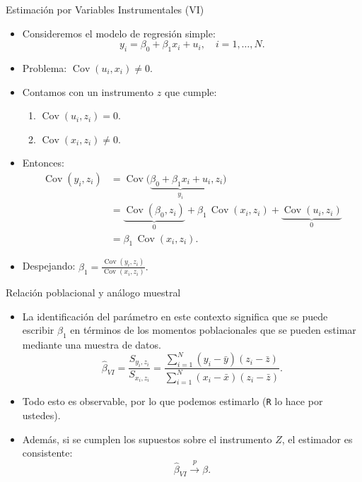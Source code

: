 \documentclass[10pt]{beamer}
\begin{document}
\begin{frame}{Estimaci\'on por Variables Instrumentales (VI)}
    \begin{itemize}
        \item Consideremos el modelo de regresi\'on simple:
        $$
        y_{i}=\beta_{0}+\beta_{1} x_{i}+u_{i}, \quad i=1,\ldots,N.
        $$
        \item Problema: $\operatorname{Cov}\left(u_{i},x_{i}\right) \neq 0$.
        \item Contamos con un instrumento $z$ que cumple:
        \begin{enumerate}
            \item $\operatorname{Cov}\left(u_{i},z_{i}\right)=0$.
            \item $\operatorname{Cov}\left(x_{i},z_{i}\right)\neq 0$.
        \end{enumerate}
        \item Entonces:
        $$
        \begin{aligned}
        \operatorname{Cov}\left(y_{i},z_{i}\right) &= \operatorname{Cov}\bigl(\underbrace{\beta_{0}+\beta_{1}x_{i}+u_{i}}_{y_{i}}, z_{i}\bigr) \\
        &= \underbrace{\operatorname{Cov}\left(\beta_{0},z_{i}\right)}_{0} + \beta_{1}\, \operatorname{Cov}\left(x_{i},z_{i}\right) + \underbrace{\operatorname{Cov}\left(u_{i},z_{i}\right)}_{0} \\
        &= \beta_{1}\, \operatorname{Cov}\left(x_{i},z_{i}\right).
        \end{aligned}
        $$
        \item Despejando:
$\beta_{1}=\frac{\operatorname{Cov}\left(y_{i},z_{i}\right)}{\operatorname{Cov}\left(x_{i},z_{i}\right)}.
        $
       
    \end{itemize}
\end{frame}

\begin{frame}{Relaci\'on poblacional y an\'alogo muestral}
    \begin{itemize}
     \item La {\color{blue}identificación} del
 parámetro en este contexto significa que se puede escribir $\beta_1$ en términos de los momentos
poblacionales que se pueden estimar mediante una muestra de datos.
        $$
        \hat{\beta}_{VI}=\frac{S_{y_{i},z_{i}}}{S_{x_{i},z_{i}}}=\frac{\sum_{i=1}^{N}(y_{i}-\bar{y})(z_{i}-\bar{z})}{\sum_{i=1}^{N}(x_{i}-\bar{x})(z_{i}-\bar{z})}.
        $$
        \item Todo esto es observable, por lo que podemos estimarlo (\texttt{R} lo hace por ustedes).
        \item Adem\'as, si se cumplen los supuestos sobre el instrumento $Z$, el estimador es consistente:
        $$
            \hat{\beta}_{VI} \xrightarrow{p} \beta.
        $$
    \end{itemize}
\end{frame}
\end{document}
